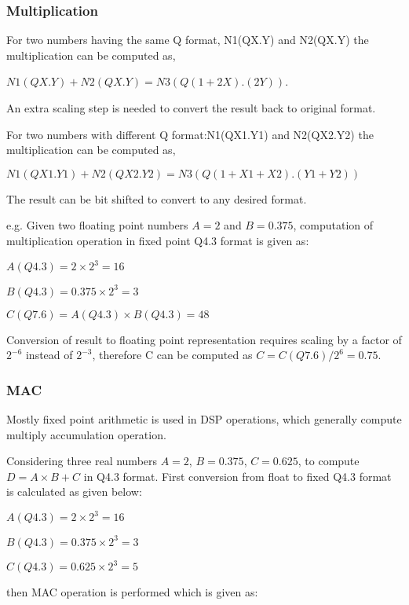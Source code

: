 \subsubsection{Multiplication}
For two numbers having the same Q format, N1(QX.Y) and N2(QX.Y) the multiplication can be computed as,


$N1(QX.Y)+N2(QX.Y)= N3(Q(1+2X).(2Y))$.

\noindent An extra scaling step is needed to convert the result back to original format.

\vspace{.25cm}
\noindent For two numbers with different Q format:N1(QX1.Y1) and N2(QX2.Y2) the multiplication can be computed as,

$N1(QX1.Y1)+N2(QX2.Y2)= N3(Q(1+X1+X2).(Y1+Y2))$

\noindent The result can be bit shifted to convert to any desired format.

\vspace{0.25cm}
\noindent e.g. Given two floating point numbers $A=2$ and $B=0.375$, computation of multiplication operation in fixed point Q4.3 format is given as:

\noindent $A(Q4.3)= 2\times 2^{3}= 16$

\noindent $B(Q4.3)= 0.375\times 2^{3}=3$

\noindent $C(Q7.6)= A(Q4.3)\times B(Q4.3)=48$

\noindent Conversion of result to floating point representation requires scaling by a factor of $2^{-6}$ instead of $2^{-3}$, therefore C can be computed as $C= C(Q7.6)/2^{6}= 0.75$.

\subsubsection{MAC}
Mostly fixed point arithmetic is used in DSP operations, which generally compute multiply accumulation operation.

\vspace{0.25cm}
\noindent Considering three real numbers $A=2$, $B=0.375$, $C=0.625$, to compute $D=A\times B+C$ in Q4.3 format. First conversion from float to fixed Q4.3 format is calculated as given below:

\noindent $A(Q4.3)=2\times 2^{3}=16$

\noindent $B(Q4.3)= 0.375\times 2^{3}=3$

\noindent $C(Q4.3)= 0.625\times 2^{3}=5$

\noindent then MAC operation is performed which is given as:

